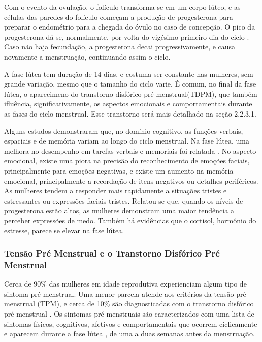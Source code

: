 Com o evento da ovulação, o folículo transforma-se em um corpo lúteo, e as 
células das paredes do folículo começam a produção de progesterona para 
preparar o endométrio para a chegada do óvulo no caso de concepção. 
O pico da progesterona dá-se, normalmente, por volta do vigésimo primeiro 
dia do ciclo \cite{nikas2003}. Caso não haja fecundação, a progesterona 
decai progressivamente, e causa novamente a menstruação, continuando assim 
o ciclo.

A fase lútea tem duração de 14 dias, e costuma ser constante nas mulheres, 
sem grande variação, mesmo que o tamanho do ciclo varie. É comum, no final 
da fase lútea, o aparecimeno do transtorno disfórico pré-menstrual(TDPM), 
que também ifluência, significativamente, os aspectos emocionais e 
comportamentais durante as fases do ciclo menstrual. Esse transtorno 
será mais detalhado na seção 2.2.3.1.

Alguns estudos demonstraram que, no domínio cognitivo, as funções verbais, 
espaciais e de memória variam ao longo do ciclo menstrual. Na fase lútea, 
uma melhora no desempenho em tarefas verbais e memoriais foi relatada 
\cite{hausmann2000}. No aspecto emocional, existe uma piora na precisão 
do reconhecimento de emoções faciais, principalmente para emoções negativas, 
e existe um aumento na memória emocional, principalmente a recordação de 
itens negativos ou detalhes periféricos. As mulheres tendem a responder 
mais rapidamente a situações tristes e estressantes ou expressões faciais 
tristes. Relatou-se que, quando os níveis de progesterona estão altos, as 
mulheres demonstram uma maior tendência a perceber expressões de medo. 
Também há evidências que o cortisol, hormônio do estresse, parece se elevar 
na fase lútea\cite{kirschbaum1999}.

\subsubsection{Tensão Pré Menstrual e o Transtorno Disfórico Pré Menstrual}

Cerca de 90\% das mulheres em idade reprodutiva experienciam algum tipo de 
sintoma pré-menstrual. Uma menor parcela atende aos critérios da tensão 
pré-menstrual (TPM), e cerca de 10\% são diagnosticadas com o transtorno 
disfórico pré menstrual \cite{mishell2005}. Os sintomas pré-menstruais 
são caracterizados com uma lista de sintomas físicos, cognitivos, 
afetivos e comportamentais que ocorrem ciclicamente e aparecem durante a 
fase lútea \cite{obrien2011}, de uma a duas semanas antes da menstruação. 


